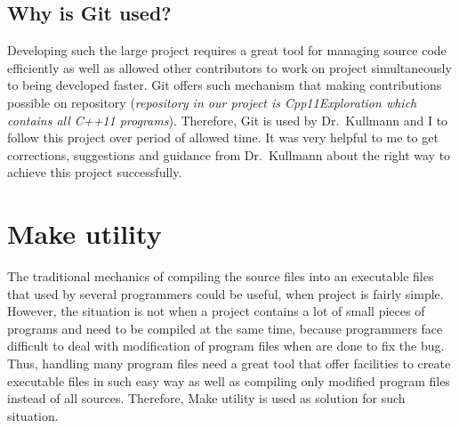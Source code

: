 \documentclass[11pt]{report}
\begin{document}
\begin{figure}[h]
\begin{center}
{\label{fig:gitstage}}
\end{center}
\end{figure}

\subsection{Why is Git used?}
\label{subsec: why git}
Developing such the large project requires a great tool for managing source code efficiently as well as allowed other contributors to work on project simultaneously to being developed faster. Git offers such mechanism that making contributions possible on repository (\emph{repository in our project is Cpp11Exploration which contains all C++11 programs}). Therefore, Git is used by Dr.~Kullmann and I to follow this project over period of allowed time. It was very helpful to me to get corrections, suggestions and guidance from Dr.~Kullmann about the right way to achieve this project successfully.

\section{Make utility}
\label{sec: Make}
The traditional mechanics of compiling the source files into an executable files that used by several programmers could be useful, when project is fairly simple. However, the situation is not when a project contains a lot of small pieces of programs and need to be compiled at the same time, because programmers face difficult to deal with modification of program files when are done to fix the bug. Thus, handling many program files need a great tool that offer facilities to create executable files in such easy way as well as compiling only modified program files instead of all sources. Therefore, Make utility is used as solution for such situation.
\end{document}
